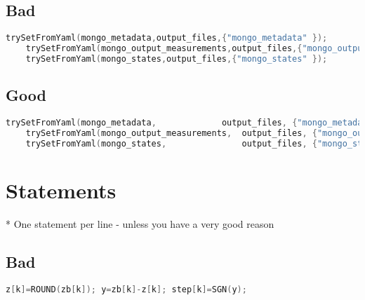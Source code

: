 
\subsection{Bad}

\begin{lstlisting}[language=c++]
    trySetFromYaml(mongo_metadata,output_files,{"mongo_metadata" });
    trySetFromYaml(mongo_output_measurements,output_files,{"mongo_output_measurements" });
    trySetFromYaml(mongo_states,output_files,{"mongo_states" });
\end{lstlisting}

\subsection{Good}
\begin{lstlisting}[language=c++]
    trySetFromYaml(mongo_metadata,             output_files, {"mongo_metadata"              });
    trySetFromYaml(mongo_output_measurements,  output_files, {"mongo_output_measurements"	});
    trySetFromYaml(mongo_states,               output_files, {"mongo_states"		        });
\end{lstlisting}

\section{Statements}

* One statement per line  - \*unless you have a very good reason

\subsection{Bad}
\begin{lstlisting}[language=c++]
    z[k]=ROUND(zb[k]); y=zb[k]-z[k]; step[k]=SGN(y);
\end{lstlisting}

